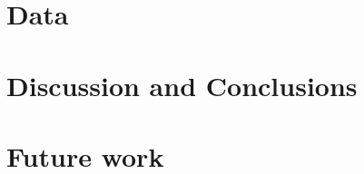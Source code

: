 \documentclass[usenatbib]{mn2e}
\begin{document}
\section{Data}

\section{Discussion and Conclusions}

\section{Future work} 


\end{document}
